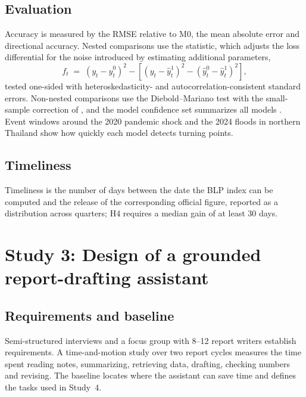 \documentclass[11pt]{article}
\begin{document}
\subsection{Evaluation}
Accuracy is measured by the RMSE relative to M0, the mean absolute error and directional accuracy. Nested comparisons use the \citet{clark2007approximately} statistic, which adjusts the loss differential for the noise introduced by estimating additional parameters,
\begin{equation}\label{eq:cw}
f_{t} \;=\; \left(y_{t} - \hat{y}^{0}_{t}\right)^{2} - \left[\left(y_{t} - \hat{y}^{1}_{t}\right)^{2} - \left(\hat{y}^{0}_{t} - \hat{y}^{1}_{t}\right)^{2}\right],
\end{equation}
tested one-sided with heteroskedasticity- and autocorrelation-consistent standard errors. Non-nested comparisons use the Diebold--Mariano test with the small-sample correction of \citet{harvey1997testing}, and the model confidence set summarizes all models \citep{hansen2011mcs}. Event windows around the 2020 pandemic shock and the 2024 floods in northern Thailand show how quickly each model detects turning points.

\subsection{Timeliness}
Timeliness is the number of days between the date the BLP index can be computed and the release of the corresponding official figure, reported as a distribution across quarters; H4 requires a median gain of at least 30 days.

\section{Study 3: Design of a grounded report-drafting assistant}\label{sec:study3}

\subsection{Requirements and baseline}
Semi-structured interviews and a focus group with 8--12 report writers establish requirements. A time-and-motion study over two report cycles measures the time spent reading notes, summarizing, retrieving data, drafting, checking numbers and revising. The baseline locates where the assistant can save time and defines the tasks used in Study~4.
\end{document}

